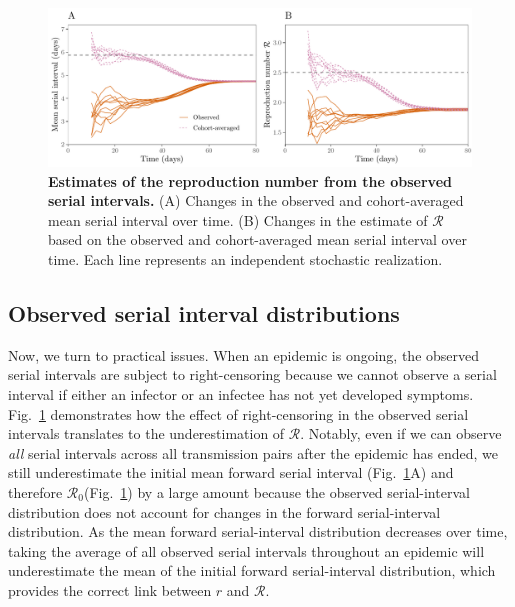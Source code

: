 \documentclass[12pt]{article}
\newcommand{\fref}[1]{Fig.~\ref{fig:#1}}
\newcommand{\Rx}[1]{\ensuremath{{\mathcal R}_{#1}}\xspace}
\newcommand{\Ro}{\Rx{0}}
\newcommand{\RR}{\ensuremath{{\mathcal R}}\xspace}
\begin{document}
\begin{figure}[!ht]
\includegraphics[width=\textwidth]{observedrR.pdf}
\caption{
\textbf{Estimates of the reproduction number from the observed serial intervals.}
(A) Changes in the observed and cohort-averaged mean serial interval over time.
(B) Changes in the estimate of \RR based on the observed and cohort-averaged mean serial interval over time.
Each line represents an independent stochastic realization.
}
\label{fig:obsrR}
\end{figure}

\subsection{Observed serial interval distributions}

Now, we turn to practical issues.
When an epidemic is ongoing, the observed serial intervals are subject to right-censoring because we cannot observe a serial interval if either an infector or an infectee has not yet developed symptoms.
\fref{obsrR} demonstrates how the effect of right-censoring in the observed serial intervals translates to the underestimation of \RR.
Notably, even if we can observe \emph{all} serial intervals across all transmission pairs after the epidemic has ended, we still underestimate the initial mean forward serial interval (\fref{obsrR}A) and therefore \Ro (\fref{obsrR}) by a large amount because the observed serial-interval distribution does not account for changes in the forward serial-interval distribution.
As the mean forward serial-interval distribution decreases over time, taking the average of all observed serial intervals throughout an epidemic will underestimate the mean of the initial forward serial-interval distribution, which provides the correct link between $r$ and \RR.
\end{document}

